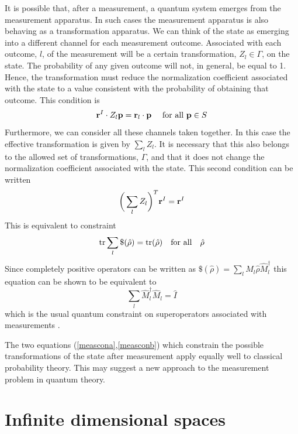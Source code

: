\documentclass[10pt,twocolumn]{article}
\begin{document}
It is possible that, after a measurement, a quantum system emerges from
the measurement apparatus.  In such cases the measurement apparatus is
also behaving as a transformation apparatus. We can think of the state
as emerging into a different channel for each measurement outcome.
Associated with each
outcome, $l$, of the measurement will be a certain transformation,
$Z_l\in \Gamma$, on the state.
The probability of any given outcome will not, in
general, be equal to 1.  Hence, the transformation must reduce the
normalization coefficient associated with the state to a value
consistent with the probability of obtaining that outcome.  This
condition is
\begin{equation}\label{meascona}
{\bf r}^I\cdot Z_l {\bf p} = {\bf r}_l\cdot{\bf p} ~~~~{\rm for~all~}
{\bf p}\in S
\end{equation}
Furthermore, we can consider all these channels taken together.  In this
case the effective transformation is given by $\sum_l Z_l$.  It is
necessary that this also belongs to the allowed set of transformations,
$\Gamma$, and that it does not change the normalization coefficient
associated with the state.  This second condition can be written
\begin{equation}\label{measconb}
\bigg(\sum_l Z_l\bigg)^T {\bf r}^I ={\bf r}^I
\end{equation}
This is equivalent to constraint
\begin{equation}
{\rm tr}\sum_l \$ (\hat{\rho}) = {\rm tr}(\hat{\rho}) ~~~{\rm
for~all}~~~\hat{\rho}
\end{equation}
Since completely positive operators can be written as
$\$(\hat{\rho})=\sum_l \hat{M}_l\hat{\rho}\hat{M}_l^\dagger $ this
equation can be shown to be equivalent to
\begin{equation}
\sum_l \hat{M}_l^\dagger \hat{M}_l = \hat{I}
\end{equation}
which is the usual quantum constraint on superoperators associated with
measurements \cite{krauss,Nielsenchuang}.

The two equations (\ref{meascona},\ref{measconb}) which constrain the
possible transformations of the state after measurement apply equally
well to classical probability theory.  This may suggest a new approach
to the measurement problem in quantum theory.

\section{Infinite dimensional spaces}
\end{document}
